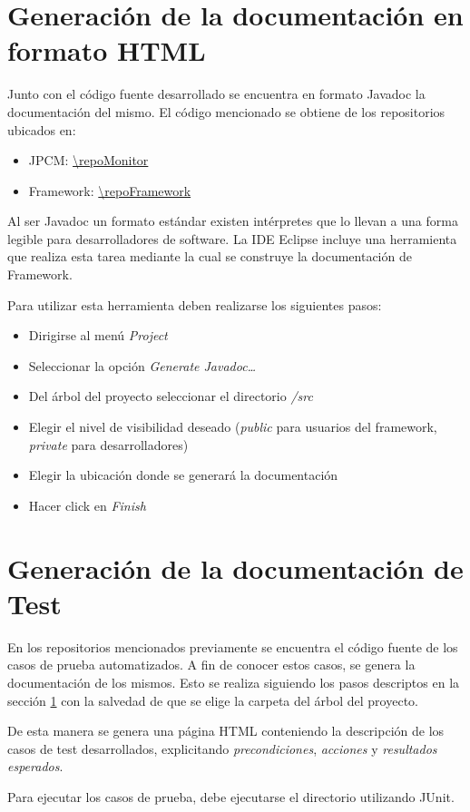 \section{Generación de la documentación en formato HTML}
\label{genJavadoc}
Junto con el código fuente desarrollado se encuentra en formato Javadoc la
documentación del mismo. El código mencionado se obtiene de los repositorios
ubicados en:
\begin{itemize}
  \item JPCM: \url{\repoMonitor}
  \item \nombreFramework Framework: \url{\repoFramework}
\end{itemize}

 Al ser Javadoc un formato estándar existen intérpretes
que lo llevan a una forma legible para desarrolladores de software.
La IDE Eclipse incluye una herramienta que realiza esta tarea mediante la cual
se construye la documentación de \nombreFramework Framework.

Para utilizar esta herramienta deben realizarse los siguientes pasos:
\begin{itemize}
  \item Dirigirse al menú \textit{Project}
  \item Seleccionar la opción \textit{Generate Javadoc\ldots}
  \item Del árbol del proyecto seleccionar el directorio \textit{/src}
  \item Elegir el nivel de visibilidad deseado (\textit{public} para usuarios
  del framework, \textit{private} para desarrolladores)
  \item Elegir la ubicación donde se generará la documentación
  \item Hacer click en \textit{Finish}
\end{itemize}

\section{Generación de la documentación de Test}
En los repositorios mencionados previamente se encuentra el código fuente de los
casos de prueba automatizados. A fin de conocer estos casos, se genera la
documentación de los mismos.
Esto se realiza siguiendo los pasos descriptos en la sección \ref{genJavadoc}
con la salvedad de que se elige la carpeta  del árbol del proyecto.

De esta manera se genera una página HTML conteniendo la descripción de los casos
de test desarrollados, explicitando \textit{precondiciones}, \textit{acciones} y
\textit{resultados esperados}.

Para ejecutar los casos de prueba, debe ejecutarse el directorio 
utilizando JUnit.
